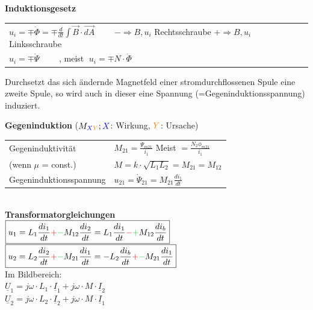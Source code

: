 \renewcommand{\arraystretch}{1.5}
\textbf{Induktionsgesetz}\\
		\begin{tabular}[c]{p{8.7cm}}
			$u_i= \mp \dot{\Phi} = \mp \frac{d}{dt} \int \vec{B} \cdot
			\vec{dA}\qquad $ \parbox{3cm}{\tiny{$- \Rightarrow B,u_i $
			Rechtsschraube\\ $+ \Rightarrow B,u_i $
			Linksschraube}}
			\\
			
			$u_i= \mp \dot{\Psi}\qquad$ , meist $\; u_i = \mp
			N\cdot\dot{\Phi}$		
		\end{tabular}
		\parbox{8cm}{Durchsetzt das sich \"andernde Magnetfeld einer stromdurchflossenen Spule
					eine zweite Spule, so wird auch in dieser eine Spannung
					(=Gegeninduktionsspannung) induziert.}	

\begin{multicols}{2}
 		\textbf{Gegeninduktion} ($M_{\textcolor{blue}{X}\textcolor{orange}{Y}}; \textcolor{blue}{X}$: Wirkung,
 		$\textcolor{orange}{Y}$: Ursache)\\
		\begin{tabular}{ll}
  		Gegeninduktivit\"at
  			& $M_{21} = \frac{\Psi_{m21}}{i_1}$ Meist $= \frac{N_2 \phi_{m21}}{i_1}$\\ 
  			(wenn $\mu$ = const.) & $M = k \cdot \sqrt{L_1 L_2} = M_{21} = M_{12} $  \\
  			Gegeninduktionsspannung
  			& $u_{21} = \dot{\Psi}_{21} = M_{21} \frac{di_1}{dt}$ \\
		\end{tabular}\\

  		\textbf{Transformatorgleichungen}\\
		$\boxed{u_1 = L_1 \dfrac{di_1}{dt} \textcolor{red}{+}\textcolor{green}{-}M_{12}
		\dfrac{di_2}{dt} = L_1 \dfrac{di_1}{dt} \textcolor{red}{-}\textcolor{green}{+}M_{12} \dfrac{di_b}{dt}}$ \\
		$\boxed{u_2 = L_2 \dfrac{di_2}{dt}\textcolor{red}{+}\textcolor{green}{-} M_{21}
		\dfrac{d i_1}{dt} = -L_2 \dfrac{di_b}{dt}
		\textcolor{red}{+}\textcolor{green}{-} M_{21} \dfrac{d i_1}{dt}}$\\
		Im Bildbereich:\\
		$\underline{U}_1 = j\omega\cdot L_1 \cdot \underline{I}_1 + j\omega\cdot M \cdot \underline{I}_2$\\
		$\underline{U}_2 = j\omega\cdot L_2 \cdot \underline{I}_2 + j\omega\cdot M \cdot \underline{I}_1$\\
  			

\end{multicols}
